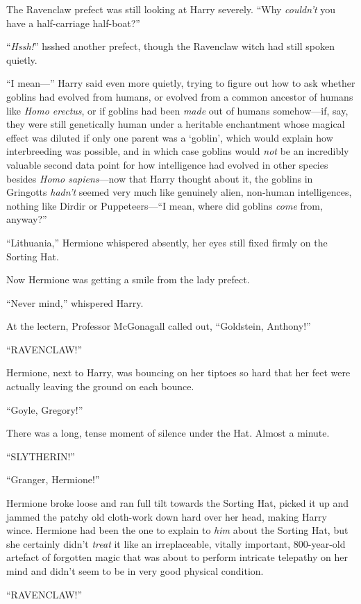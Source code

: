 The Ravenclaw prefect was still looking at Harry severely. “Why \emph{couldn’t} you have a half-carriage half-boat?”

“\emph{Hssh!}” hsshed another prefect, though the Ravenclaw witch had still spoken quietly.

“I mean—” Harry said even more quietly, trying to figure out how to ask whether goblins had evolved from humans, or evolved from a common ancestor of humans like \emph{Homo erectus}, or if goblins had been \emph{made} out of humans somehow—if, say, they were still genetically human under a heritable enchantment whose magical effect was diluted if only one parent was a ‘goblin’, which would explain how interbreeding was possible, and in which case goblins would \emph{not} be an incredibly valuable second data point for how intelligence had evolved in other species besides \emph{Homo sapiens}—now that Harry thought about it, the goblins in Gringotts \emph{hadn’t} seemed very much like genuinely alien, non-human intelligences, nothing like Dirdir or Puppeteers—“I mean, where did goblins \emph{come} from, anyway?”

“Lithuania,” Hermione whispered absently, her eyes still fixed firmly on the Sorting Hat.

Now Hermione was getting a smile from the lady prefect.

“Never mind,” whispered Harry.

At the lectern, Professor McGonagall called out, “Goldstein, Anthony!”

“RAVENCLAW!”

Hermione, next to Harry, was bouncing on her tiptoes so hard that her feet were actually leaving the ground on each bounce.

“Goyle, Gregory!”

There was a long, tense moment of silence under the Hat. Almost a minute.

“SLYTHERIN!”

“Granger, Hermione!”

Hermione broke loose and ran full tilt towards the Sorting Hat, picked it up and jammed the patchy old cloth-work down hard over her head, making Harry wince. Hermione had been the one to explain to \emph{him} about the Sorting Hat, but she certainly didn’t \emph{treat} it like an irreplaceable, vitally important, 800-year-old artefact of forgotten magic that was about to perform intricate telepathy on her mind and didn’t seem to be in very good physical condition.

“RAVENCLAW!”

